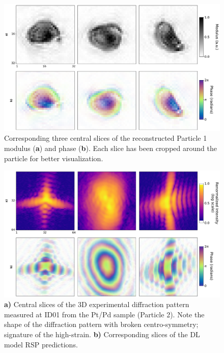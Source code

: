 \begin{figure}[H]
    \centering
    \includegraphics[width=\textwidth]{figures/Phasing/exp_data_rec1.pdf}
    \caption{Corresponding three central slices of the reconstructed Particle 1 modulus (\textbf{a}) and phase 
    (\textbf{b}). Each slice has been cropped around the particle for better visualization.}
    \label{fig:exp_obj1}
\end{figure}

\begin{figure}[H]
    \centering
    \includegraphics[width=\textwidth]{figures/Phasing/exp_data2.pdf}
    \caption{\textbf{a)} Central slices of the 3D experimental diffraction pattern measured at ID01 from the Pt/Pd sample 
    (Particle 2). Note the shape of the diffraction pattern with broken centro-symmetry; signature of the high-strain. 
     \textbf{b)} Corresponding slices of the DL model RSP predictions.}
    \label{fig:exp_RSP2}
\end{figure}

